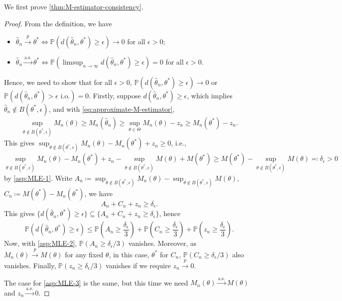 We first prove \autoref{thm:M-estimator-consistency}.

\begin{proof}
	From the definition, we have
	\begin{itemize}
		\item \(\hat{\theta} _n \overset{p}{\to} \theta ^{\ast} \iff \mathbb{P} (d(\hat{\theta} _n, \theta ^{\ast} ) \geq \epsilon ) \to 0\) for all \(\epsilon > 0\);
		\item \(\hat{\theta} _n \overset{\text{a.s.} }{\to} \theta ^{\ast} \iff \mathbb{P} (\limsup_{n \to \infty} d(\hat{\theta} _n, \theta ^{\ast} ) \geq \epsilon ) = 0\) for all \(\epsilon > 0\).
	\end{itemize}
	Hence, we need to show that for all \(\epsilon > 0\), \(\mathbb{P} (d(\hat{\theta} _n , \theta ^{\ast} ) \geq \epsilon ) \to 0\) or \(\mathbb{P} (d(\hat{\theta} _n, \theta ^{\ast} ) > \epsilon \text{ i.o.} ) = 0\). Firstly, suppose \(d(\hat{\theta} _n, \theta ^{\ast} ) \geq \epsilon \), which implies \(\hat{\theta} _n \notin B(\theta ^{\ast} , \epsilon )\), and with \autoref{eq:approximate-M-estimator},
	\[
		\sup _{\theta \notin B(\theta ^{\ast} , \epsilon )} M_n(\theta )
		\geq M_n(\hat{\theta} _n)
		\geq \sup _{\theta \in \Theta } M_n(\theta ) - z_n
		\geq M_n(\theta ^{\ast} ) - z_n.
	\]
	This gives \(\sup _{\theta \notin B(\theta ^{\ast} , \epsilon )}M_n(\theta ) - M_n (\theta ^{\ast} ) + z_n \geq 0\), i.e.,
	\[
		\sup _{\theta \notin B(\theta ^{\ast} , \epsilon )} M_n(\theta ) - M_n(\theta ^{\ast} ) + z_n - \sup _{\theta \notin B(\theta ^{\ast} , \epsilon )} M(\theta ) + M(\theta ^{\ast} )
		\geq M(\theta ^{\ast} ) - \sup _{\theta \notin B(\theta ^{\ast} , \epsilon )} M(\theta )
		\eqqcolon \delta _\epsilon > 0
	\]
	by \autoref{asp:MLE-1}. Write \(A_n \coloneqq \sup _{\theta \notin B(\theta ^{\ast} , \epsilon )} M_n(\theta ) - \sup _{\theta \notin B(\theta ^{\ast} , \epsilon )} M(\theta )\), \(C_n \coloneqq M(\theta ^{\ast} ) - M_n(\theta ^{\ast} )\), we have
	\[
		A_n + C_n + z_n \geq \delta _\epsilon .
	\]
	This gives \(\{ d(\hat{\theta} _n, \theta ^{\ast} ) \geq \epsilon \} \subseteq \{ A_n + C_n + z_n \geq \delta _\epsilon  \}\), hence
	\[
		\mathbb{P} (d(\hat{\theta} _n, \theta ^{\ast} ) \geq \epsilon)
		\leq \mathbb{P} \left( A_n \geq \frac{\delta _\epsilon}{3} \right) + \mathbb{P} \left( C_n \geq \frac{\delta _\epsilon}{3} \right) + \mathbb{P} \left( z_n \geq \frac{\delta _\epsilon}{3} \right).
	\]
	Now, with \autoref{asp:MLE-2}, \(\mathbb{P} (A_n \geq \delta _\epsilon / 3)\) vanishes. Moreover, as \(M_n(\theta ) \overset{p}{\to} M(\theta )\) for any fixed \(\theta \), in this case, \(\theta ^{\ast} \) for \(C_n\), \(\mathbb{P} (C_n \geq \delta _\epsilon / 3)\) also vanishes. Finally, \(\mathbb{P} (z_n \geq \delta _\epsilon / 3)\) vanishes if we require \(z_n \overset{p}{\to} 0\).

	The case for \autoref{asp:MLE-3} is the same, but this time we need \(M_n(\theta ) \overset{\text{a.s.} }{\to} M(\theta ) \) and \(z_n \overset{\text{a.s.} }{\to} 0\).
\end{proof}

